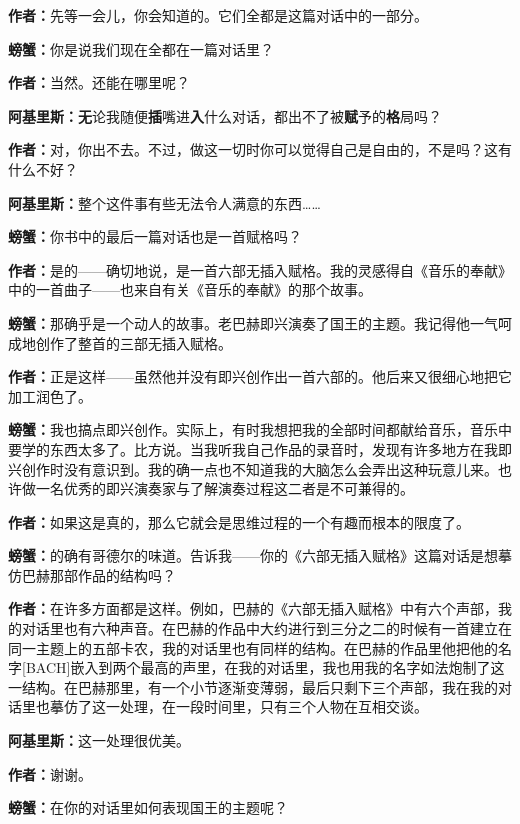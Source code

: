 \documentclass[
  12pt,
  twoside,
  openright,
  oldfontcommands,
]{memoir}
\newcommand{\heititext}[1]{{\sffamily\bfseries #1}}
\newcommand{\dialogname}[1]{{\sffamily\bfseries #1}}
\begin{document}
\dialogname{作者：}先等一会儿，你会知道的。它们全都是这篇对话中的一部分。

\dialogname{螃蟹：}你是说我们现在全都在一篇对话里？

\dialogname{作者：}当然。还能在哪里呢？

\dialogname{阿基里斯：}\heititext{无}论我随便\heititext{插}嘴进\heititext{入}什么对话，都出不了被\heititext{赋}予的\heititext{格}局吗？

\dialogname{作者：}对，你出不去。不过，做这一切时你可以觉得自己是自由的，不是吗？这有什么不好？

\dialogname{阿基里斯：}整个这件事有些无法令人满意的东西\ldots\ldots{}

\dialogname{螃蟹：}你书中的最后一篇对话也是一首赋格吗？

\dialogname{作者：}是的------确切地说，是一首六部无插入赋格。我的灵感得自《音乐的奉献》中的一首曲子------也来自有关《音乐的奉献》的那个故事。

\dialogname{螃蟹：}那确乎是一个动人的故事。老巴赫即兴演奏了国王的主题。我记得他一气呵成地创作了整首的三部无插入赋格。

\dialogname{作者：}正是这样------虽然他并没有即兴创作出一首六部的。他后来又很细心地把它加工润色了。

\dialogname{螃蟹：}我也搞点即兴创作。实际上，有时我想把我的全部时间都献给音乐，音乐中要学的东西太多了。比方说。当我听我自己作品的录音时，发现有许多地方在我即兴创作时没有意识到。我的确一点也不知道我的大脑怎么会弄出这种玩意儿来。也许做一名优秀的即兴演奏家与了解演奏过程这二者是不可兼得的。

\dialogname{作者：}如果这是真的，那么它就会是思维过程的一个有趣而根本的限度了。

\dialogname{螃蟹：}的确有哥德尔的味道。告诉我------你的《六部无插入赋格》这篇对话是想摹仿巴赫那部作品的结构吗？

\dialogname{作者：}在许多方面都是这样。例如，巴赫的《六部无插入赋格》中有六个声部，我的对话里也有六种声音。在巴赫的作品中大约进行到三分之二的时候有一首建立在同一主题上的五部卡农，我的对话里也有同样的结构。在巴赫的作品里他把他的名字{[}BACH{]}嵌入到两个最高的声里，在我的对话里，我也用我的名字如法炮制了这一结构。在巴赫那里，有一个小节逐渐变薄弱，最后只剩下三个声部，我在我的对话里也摹仿了这一处理，在一段时间里，只有三个人物在互相交谈。

\dialogname{阿基里斯：}这一处理很优美。

\dialogname{作者：}谢谢。

\dialogname{螃蟹：}在你的对话里如何表现国王的主题呢？
\end{document}
